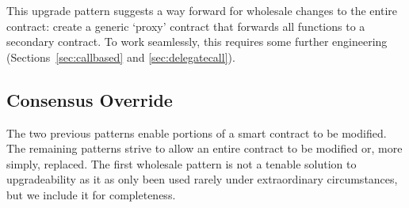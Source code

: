 This upgrade pattern suggests a way forward for wholesale changes to the entire contract: create a generic `proxy' contract that forwards all functions to a secondary contract. To work seamlessly, this requires some further engineering (Sections~\ref{sec:callbased} and \ref{sec:delegatecall}).






\subsection{Consensus Override}
\label{sec:hardfork}

The two previous patterns enable portions of a smart contract to be modified. The remaining patterns strive to allow an entire contract to be modified or, more simply, replaced. The first wholesale pattern is not a tenable solution to upgradeability as it as only been used rarely under extraordinary circumstances, but we include it for completeness. 

